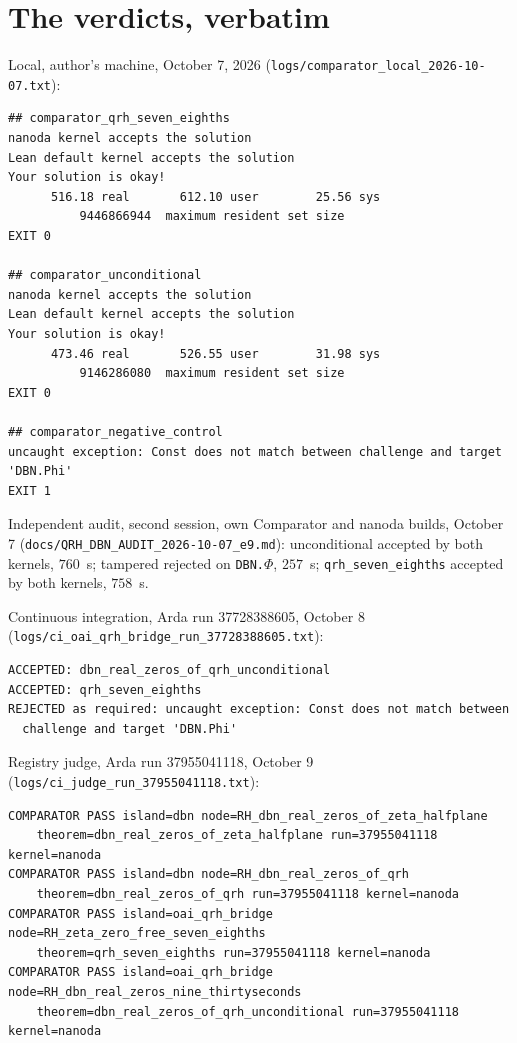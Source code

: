 \documentclass[11pt]{article}
\theoremstyle{definition}
\begin{document}
\section{The verdicts, verbatim}\label{app:logs}

Local, author's machine, October 7, 2026 (\texttt{logs/comparator\_local\_2026-10-07.txt}):
\begin{verbatim}
## comparator_qrh_seven_eighths
nanoda kernel accepts the solution
Lean default kernel accepts the solution
Your solution is okay!
      516.18 real       612.10 user        25.56 sys
          9446866944  maximum resident set size
EXIT 0

## comparator_unconditional
nanoda kernel accepts the solution
Lean default kernel accepts the solution
Your solution is okay!
      473.46 real       526.55 user        31.98 sys
          9146286080  maximum resident set size
EXIT 0

## comparator_negative_control
uncaught exception: Const does not match between challenge and target 'DBN.Phi'
EXIT 1
\end{verbatim}

Independent audit, second session, own Comparator and nanoda builds, October 7 (\texttt{docs/QRH\_DBN\_AUDIT\_2026-10-07\_e9.md}): unconditional accepted by both kernels, $760$~s; tampered rejected on \texttt{DBN.$\Phi$}, $257$~s; \texttt{qrh\_seven\_eighths} accepted by both kernels, $758$~s.

Continuous integration, Arda run 37728388605, October 8 (\texttt{logs/ci\_oai\_qrh\_bridge\_run\_37728388605.txt}):
\begin{verbatim}
ACCEPTED: dbn_real_zeros_of_qrh_unconditional
ACCEPTED: qrh_seven_eighths
REJECTED as required: uncaught exception: Const does not match between
  challenge and target 'DBN.Phi'
\end{verbatim}

Registry judge, Arda run 37955041118, October 9 (\texttt{logs/ci\_judge\_run\_37955041118.txt}):
\begin{verbatim}
COMPARATOR PASS island=dbn node=RH_dbn_real_zeros_of_zeta_halfplane
    theorem=dbn_real_zeros_of_zeta_halfplane run=37955041118 kernel=nanoda
COMPARATOR PASS island=dbn node=RH_dbn_real_zeros_of_qrh
    theorem=dbn_real_zeros_of_qrh run=37955041118 kernel=nanoda
COMPARATOR PASS island=oai_qrh_bridge node=RH_zeta_zero_free_seven_eighths
    theorem=qrh_seven_eighths run=37955041118 kernel=nanoda
COMPARATOR PASS island=oai_qrh_bridge node=RH_dbn_real_zeros_nine_thirtyseconds
    theorem=dbn_real_zeros_of_qrh_unconditional run=37955041118 kernel=nanoda
\end{verbatim}
\end{document}
